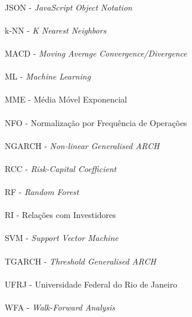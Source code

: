 \paragraph{}JSON - \textit{JavaScript Object Notation}
\paragraph{}k-NN - \textit{K Nearest Neighbors}
\paragraph{}MACD - \textit{Moving Average Convergence/Divergence}
\paragraph{}ML - \textit{Machine Learning}
\paragraph{}MME - Média Móvel Exponencial
\paragraph{}NFO - Normalização por Frequência de Operações
\paragraph{}NGARCH - \textit{Non-linear Generalised ARCH}
\paragraph{}RCC - \textit{Risk-Capital Coefficient}
\paragraph{}RF - \textit{Random Forest}
\paragraph{}RI - Relações com Investidores
\paragraph{}SVM - \textit{Support Vector Machine}
\paragraph{}TGARCH - \textit{Threshold Generalised ARCH}
\paragraph{}UFRJ - Universidade Federal do Rio de Janeiro
\paragraph{}WFA - \textit{Walk-Forward Analysis}

\pagebreak